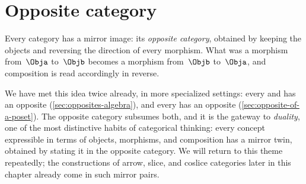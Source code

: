 
\section{Opposite category}
\label{sec:opposite-category}


Every category has a mirror image: its \emph{opposite category}, obtained by keeping the objects and reversing the direction of every morphism.
What was a morphism from~$\Obja$ to~$\Objb$ becomes a morphism from~$\Objb$ to~$\Obja$, and composition is read accordingly in reverse.

We have met this idea twice already, in more specialized settings: every  and  has an opposite (\cref{sec:opposites-algebra}), and every  has an opposite (\cref{sec:opposite-of-a-poset}).
The opposite category subsumes both, and it is the gateway to \emph{duality}, one of the most distinctive habits of categorical thinking: every concept expressible in terms of objects, morphisms, and composition has a mirror twin, obtained by stating it in the opposite category.
We will return to this theme repeatedly; the constructions of arrow, slice, and coslice categories later in this chapter already come in such mirror pairs.

